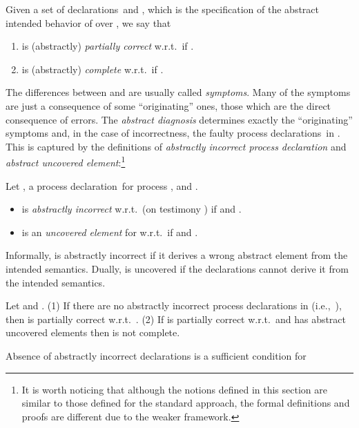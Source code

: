 \documentclass[american]{new_tlp}
\newcommand*{\deffun}[1][A]{process}
\newcommand*{\program}{set of declarations}
\newcommand*{\progrules}{\progrule s}
\newcommand*{\progrule}{process declaration}
\providecommand*{\ie}   {i.e.,}
\providecommand*{\wrt}  {w.r.t.}
\begin{document}
Given a \program\  and , which is the specification
of the abstract intended behavior of  over , we say that
\begin{enumerate}
    
    \item\label{pt:COR:def:Correct}
     is (abstractly) \emph{partially correct}
    \wrt\  if .
    
    \item\label{pt:COM:def:Correct}
     is (abstractly) \emph{complete} \wrt\  if
    .
\end{enumerate}
The differences between  and  are usually called
\emph{symptoms}.  Many of the symptoms are just a consequence of some
``originating'' ones, those which are the direct consequence of errors.
The \emph{abstract diagnosis} determines exactly the ``originating''
symptoms and, in the case of incorrectness, the faulty \progrules\ in .
This is captured by the definitions of \emph{abstractly incorrect
\progrule} and \emph{abstract uncovered element}:\footnote{It is worth
noticing that although the notions defined in this section are similar to
those defined for the standard approach, the formal definitions and proofs
are different due to the weaker framework.}
\begin{definition}
    \label{def:ab.incorclau}
    \label{def:ab.uncovered}
    
    Let ,  a \progrule\ for \deffun[long] ,
     and .
    \begin{itemize}
        \item  is \emph{abstractly incorrect} \wrt\  (on testimony
        ) if  and
         .
        
        \item  is an \emph{uncovered element} for 
        \wrt\  if  and
        .
    \end{itemize}
\end{definition}
Informally,  is abstractly incorrect if it derives a wrong abstract
element  from the intended semantics.  Dually,  is
uncovered if the declarations cannot derive it from the intended semantics.
\begin{theorem}
    \label{th:ab.corr-compl}
    Let  and . (1)
    If there are no abstractly incorrect
    process declarations in  (\ie\ ),
    then  is partially correct \wrt\ .
    (2) If  is partially correct \wrt\  and  has abstract
    uncovered elements then  is not complete.
\end{theorem}
Absence of abstractly incorrect declarations is a sufficient condition for
\end{document}
